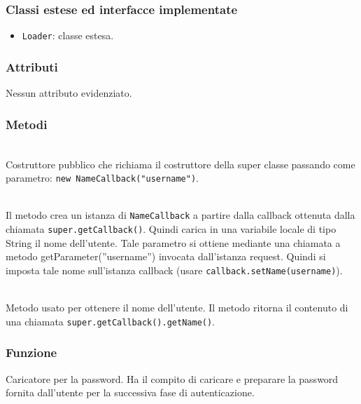 \subsubsection*{Classi estese ed interfacce implementate}

\begin{itemize}
	\item \texttt{Loader}: classe estesa.
\end{itemize}

\subsubsection*{Attributi}

Nessun attributo evidenziato.

\subsubsection*{Metodi}
\begin{description}
	\item{}\\
	Costruttore pubblico che richiama il costruttore della super classe passando come parametro: \verb|new NameCallback("username")|.
	
	\item{}\\
	Il metodo crea un istanza di \texttt{NameCallback} a partire dalla callback ottenuta dalla chiamata \verb|super.getCallback()|. Quindi carica in una variabile locale di tipo String il nome dell'utente. Tale parametro si ottiene mediante una chiamata a metodo getParameter(''username'') invocata dall'istanza request. Quindi si imposta tale nome sull'istanza callback (usare \verb|callback.setName(username)|).
	
	\item{}\\
	Metodo usato per ottenere il nome dell'utente. Il metodo ritorna il contenuto di una chiamata \verb|super.getCallback().getName()|.
	
\end{description}


\subsubsection*{Funzione}
Caricatore per la password. Ha il compito di caricare e preparare la password fornita dall'utente per la successiva fase di autenticazione.

